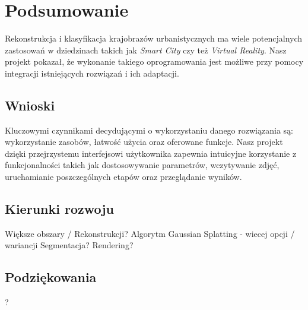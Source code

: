 \section{Podsumowanie}
Rekonstrukcja i klasyfikacja krajobrazów urbanistycznych ma wiele potencjalnych zastosowań w dziedzinach takich jak \textit{Smart City} czy też \textit{Virtual Reality}. Nasz projekt pokazał, że wykonanie takiego oprogramowania jest możliwe przy pomocy integracji istniejących rozwiązań i ich adaptacji. 

\subsection{Wnioski}
Kluczowymi czynnikami decydującymi o wykorzystaniu danego rozwiązania są: wykorzystanie zasobów, łatwość użycia oraz oferowane funkcje. Nasz projekt dzięki przejrzystemu interfejsowi użytkownika zapewnia intuicyjne korzystanie z funkcjonalności takich jak dostosowywanie parametrów, wczytywanie zdjęć, uruchamianie poszczególnych etapów oraz przeglądanie wyników. 

\subsection{Kierunki rozwoju}
Większe obszary / Rekonstrukcji? 
Algorytm Gaussian Splatting - wiecej opcji / wariancji 
Segmentacja? 
Rendering? 

\subsection{Podziękowania}
?